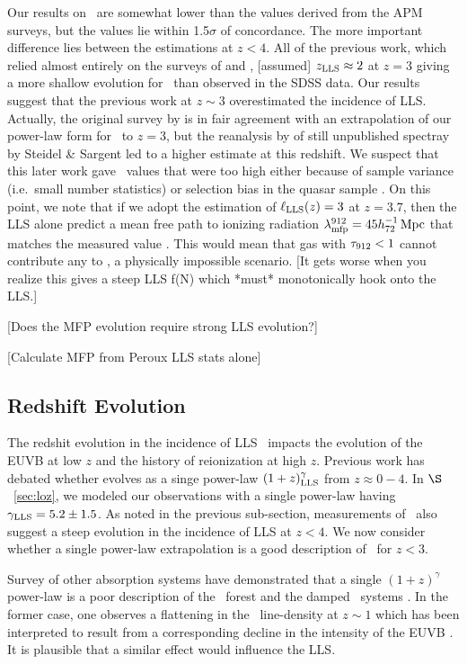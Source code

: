 \documentclass[12pt,preprint]{aastex}
\begin{document}
Our results on \lzlls\ are somewhat lower than the values derived 
from the APM surveys, but the values lie within
1.5$\sigma$ of concordance.  The more important difference lies between
the estimations at $z<4$.  All of the previous work, which relied
almost entirely on the surveys of \cite{ssb89} and \cite{lzt93}, 
[assumed] $z_{\rm LLS} \approx 2$ at $z = 3$ giving a more shallow
evolution for \lzlls\ than observed in the SDSS data.
Our results suggest that the previous work at $z \sim 3$ overestimated
the incidence of LLS.  Actually, the original survey by \cite{ssb89}
is in fair agreement with an extrapolation of our power-law form
for \lzlls\ to $z=3$, but the reanalysis by \cite{sl95} of still
unpublished spectray by Steidel \& Sargent led to a higher estimate
at this redshift.  We suspect that this later work gave \lzlls\ values
that were too high either because of sample variance (i.e.\ small
number statistics) or selection bias in the quasar sample 
\citep[e.g.\ the color-selection bias 
described in][and $\S$~\ref{sec:loz}]{pwo09}.
On this point, we note that if we adopt the \cite{peroux03} estimation
of $\ell_{\rm{LLS}}(z) = 3$ at $z=3.7$, then the LLS alone predict a mean free path
to ionizing radiation $\lambda_{\rm mfp}^{912} = 45 {h_{72}^{-1} \, \rm Mpc}$ that matches the measured
value \citep{pwo09}.  This would mean that gas with $\tau_{\rm 912} < 1$
cannot contribute any to \lmfp, a physically impossible scenario.
[It gets worse when you realize this gives a steep LLS f(N) which *must*
monotonically hook onto the LLS.]

[Does the MFP evolution require strong LLS evolution?]

[Calculate MFP from Peroux LLS stats alone]


\subsection{Redshift Evolution}

The redshit evolution in the incidence of LLS \lzlls\ impacts
the evolution of the EUVB at low $z$ and the history of reionization
at high $z$.  Previous work has debated whether \lzlls evolves
as a singe power-law $(1+z)^\gamma_{\rm LLS}$ from $z \approx 0 - 4$.
In $\S$~\ref{sec:loz}, we modeled our observations with a 
single power-law having $\gamma_{\rm LLS} = 5.2 \pm 1.5$.
As noted in the previous sub-section, measurements of \lmfp\ also
suggest a steep evolution in the incidence of LLS at $z<4$. 
We now consider whether a single power-law extrapolation is
a good description of \lzlls\ for $z < 3$.

Survey of other  absorption systems have demonstrated
that a single $(1+z)^\gamma$ power-law is a poor description
of the \lya\ forest \citep{weymann} and the damped \lya\ systems
\citep{phh08}.  In the former case, one observes a flattening
in the \lya\ line-density at $z \sim 1$ which has been interpreted
to result from a corresponding decline in the intensity of 
the EUVB \citep{weymann,dave}.  It is plausible that a similar
effect would influence the LLS.
\end{document}
